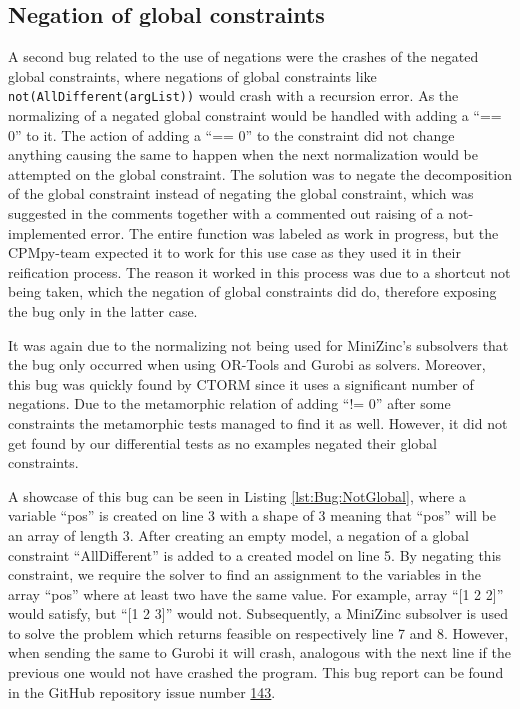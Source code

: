 \subsection{Negation of global constraints}
\label{res:bug:NegatedGlobal}
A second bug related to the use of negations were the crashes of the negated global constraints, where negations of global constraints like \texttt{not(AllDifferent(argList))} would crash with a recursion error. As the normalizing of a negated global constraint would be handled with adding a “== 0” to it. The action of adding a “== 0” to the constraint did not change anything causing the same to happen when the next normalization would be attempted on the global constraint. The solution was to negate the decomposition of the global constraint instead of negating the global constraint, which was suggested in the comments together with a commented out raising of a not-implemented error. The entire function was labeled as work in progress, but the CPMpy-team expected it to work for this use case as they used it in their reification process. The reason it worked in this process was due to a shortcut not being taken, which the negation of global constraints did do, therefore exposing the bug only in the latter case.

It was again due to the normalizing not being used for MiniZinc’s subsolvers that the bug only occurred when using OR-Tools and Gurobi as solvers. Moreover, this bug was quickly found by CTORM since it uses a significant number of negations. Due to the metamorphic relation of adding “!= 0” after some constraints the metamorphic tests managed to find it as well. However, it did not get found by our differential tests as no examples negated their global constraints.


A showcase of this bug can be seen in Listing \ref{lst:Bug:NotGlobal}, where a variable “pos” is created on line 3 with a shape of 3 meaning that “pos” will be an array of length 3. After creating an empty model, a negation of a global constraint “AllDifferent” is added to a created model on line 5. By negating this constraint, we require the solver to find an assignment to the variables in the array “pos” where at least two have the same value. For example, array “[1 2 2]” would satisfy, but “[1 2 3]” would not. Subsequently, a MiniZinc subsolver is used to solve the problem which returns feasible on respectively line 7 and 8. However, when sending the same to Gurobi it will crash, analogous with the next line if the previous one would not have crashed the program. This bug report can be found in the GitHub repository issue number  \href{https://github.com/CPMpy/cpmpy/issues/143}{143}.



